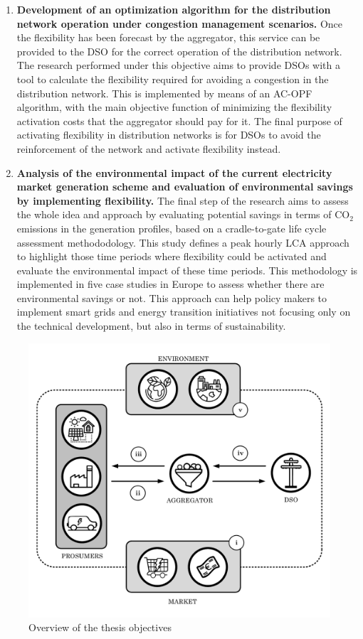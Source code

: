 \begin{enumerate}
\item \textbf{Development of an optimization algorithm for the distribution network operation under congestion management scenarios.} Once the flexibility has been forecast by the aggregator, this service can be provided to the DSO for the correct operation of the distribution network. The research performed under this objective aims to provide DSOs with a tool to calculate the flexibility required for avoiding a congestion in the distribution network. This is implemented by means of an AC-OPF algorithm, with the main objective function of minimizing the flexibility activation costs that the aggregator should pay for it. The final purpose of activating flexibility in distribution networks is for DSOs to avoid the reinforcement of the network and activate flexibility instead. 
\item \textbf{Analysis of the environmental impact of the current electricity market generation scheme and evaluation of environmental savings by implementing flexibility.} The final step of the research aims to assess the whole idea and approach by evaluating potential savings in terms of CO$_2$ emissions in the generation profiles, based on a cradle-to-gate life cycle assessment methododology. This study defines a peak hourly LCA approach to highlight those time periods where flexibility could be activated and evaluate the environmental impact of these time periods. This methodology is implemented in five case studies in Europe to assess whether there are environmental savings or not. This approach can help policy makers to implement smart grids and energy transition initiatives not focusing only on the technical development, but also in terms of sustainability. 
\end{enumerate} 

\begin{figure}[h]
	\centering 
	\includegraphics[width=0.75\columnwidth ]{ChapterIntro/Figures/objectives_figure_2.pdf}
		\caption{Overview of the thesis objectives}  
		\label{fig:objectives}
\end{figure}



